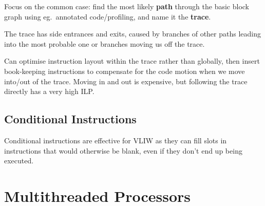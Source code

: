\documentclass[11pt]{article}
\begin{document}
{{{            Focus on the common case: find the most likely \textbf{path} through the basic block graph using eg.\ annotated code/profiling, and name it the \textbf{trace}.

            The trace has side entrances and exits, caused by branches of other paths leading into the most probable one or branches moving us off the trace.

            Can optimise instruction layout within the trace rather than globally, then insert book-keeping instructions to compensate for the code motion when we move into/out of the trace. Moving in and out is expensive, but following the trace directly has a very high ILP.
        }
    }
    \subsection*{Conditional Instructions}
    {
        Conditional instructions are effective for VLIW as they can fill slots in instructions that would otherwise be blank, even if they don't end up being executed.
    }
}
\section*{Multithreaded Processors}
{

}
\end{document}
